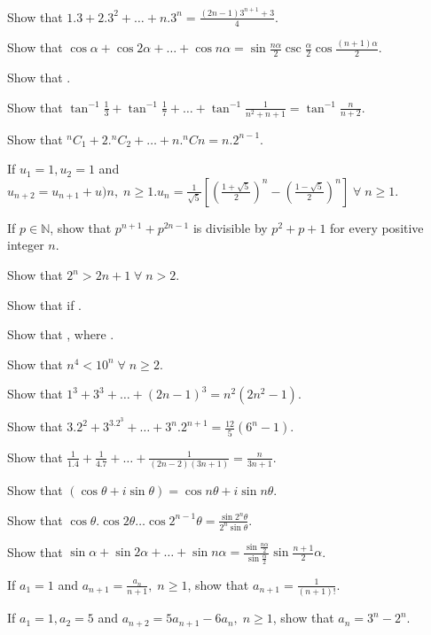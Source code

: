 \item Show that $1.3 + 2.3^2 + \ldots + n.3^n = \frac{(2n - 1)3^{n + 1} + 3}{4}$.
\item Show that $\cos\alpha + \cos2\alpha + \ldots + \cos n\alpha =
  \sin\frac{n\alpha}{2}\csc\frac{\alpha}{2}\cos\frac{(n + 1)\alpha}{2}$.
\item Show that .
\item Show that $\tan^{-1}\frac{1}{3} + \tan^{-1}\frac{1}{7} + \ldots + \tan^{-1}\frac{1}{n^2 + n + 1} = \tan^{-1}\frac{n}{n + 2}$.
\item Show that ${}^nC_1 + 2.{}^nC_2 + \ldots + n.{}^nCn = n.2^{n - 1}$.
\item If $u_1 = 1, u_2 = 1$ and $u_{n + 2} = u_{n + 1} + u)n,\;n\geq 1. u_n = \frac{1}{\sqrt{5}}\left[\left(\frac{1 +
    \sqrt{5}}{2}\right)^n - \left(\frac{1 - \sqrt{5}}{2}\right)^n\right]\;\forall\;n\geq 1$.
\item If $p\in\mathbb{N}$, show that $p^{n + 1} + p^{2n - 1}$ is divisible by $p^2 + p + 1$ for every positive integer $n$.
\item Show that $2^n > 2n + 1\;\forall\;n > 2$.
\item Show that  if .
\item Show that , where .
\item Show that $n^4 < 10^n\;\forall\;n\geq 2$.
\item Show that $1^3 + 3^3 + \ldots + (2n - 1)^3 = n^2(2n^2 - 1)$.
\item Show that $3.2^2 + 3^3.2^3 + \ldots + 3^n.2^{n + 1} = \frac{12}{5}(6^n - 1)$.
\item Show that $\frac{1}{1.4} + \frac{1}{4.7} + \ldots + \frac{1}{(2n - 2)(3n + 1)} = \frac{n}{3n+ 1}$.
\item Show that $(\cos\theta + i\sin\theta) = \cos n\theta + i\sin n\theta$.
\item Show that $\cos\theta.\cos2\theta\ldots\cos2^{n - 1}\theta = \frac{\sin2^n\theta}{2^n\sin\theta}$.
\item Show that $\sin\alpha + \sin2\alpha + \ldots + \sin n\alpha = \frac{\sin \frac{n\alpha}{2}}{\sin\frac{\alpha}{2}}\sin\frac{n +
  1}{2}\alpha$.
\item If $a_1 = 1$ and $a_{n + 1} = \frac{a_n}{n + 1},\;n\geq 1$, show that $a_{n + 1} = \frac{1}{(n + 1)!}$.
\item If $a_1 = 1, a_2 = 5$ and $a_{n + 2} = 5a_{n + 1} - 6a_n,\;n\geq 1$, show that $a_n = 3^n - 2^n$.

